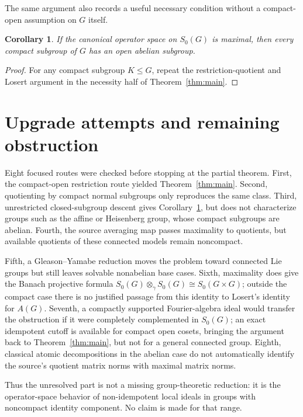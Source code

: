 \documentclass[11pt]{article}
\newtheorem{corollary}[theorem]{Corollary}
\newcommand{\Szero}{S_0}
\begin{document}
The same argument also records a useful necessary condition without a
compact-open assumption on $G$ itself.

\begin{corollary}\label{cor:hereditary}
If the canonical operator space on $\Szero(G)$ is maximal, then every compact
subgroup of $G$ has an open abelian subgroup.
\end{corollary}

\begin{proof}
For any compact subgroup $K\leq G$, repeat the restriction-quotient and
Losert argument in the necessity half of Theorem~\ref{thm:main}.
\end{proof}

\section{Upgrade attempts and remaining obstruction}

Eight focused routes were checked before stopping at the partial theorem.
First, the compact-open restriction route yielded Theorem~\ref{thm:main}.
Second, quotienting by compact normal subgroups only reproduces the same
class.  Third, unrestricted closed-subgroup descent gives
Corollary~\ref{cor:hereditary}, but does not characterize groups such as the
affine or Heisenberg group, whose compact subgroups are abelian.  Fourth,
the source averaging map passes maximality to quotients, but available
quotients of these connected models remain noncompact.

Fifth, a Gleason--Yamabe reduction moves the problem toward connected Lie
groups but still leaves solvable nonabelian base cases.  Sixth, maximality
does give the Banach projective formula
$\Szero(G)\otimes_\gamma\Szero(G)\cong\Szero(G\times G)$; outside the compact
case there is no justified passage from this identity to Losert's identity
for $A(G)$.  Seventh, a compactly supported Fourier-algebra ideal would
transfer the obstruction if it were completely complemented in $\Szero(G)$;
an exact idempotent cutoff is available for compact open cosets, bringing the
argument back to Theorem~\ref{thm:main}, but not for a general connected
group.  Eighth, classical atomic decompositions in the abelian case do not
automatically identify the source's quotient matrix norms with maximal
matrix norms.

Thus the unresolved part is not a missing group-theoretic reduction: it is
the operator-space behavior of non-idempotent local ideals in groups with
noncompact identity component.  No claim is made for that range.
\end{document}
